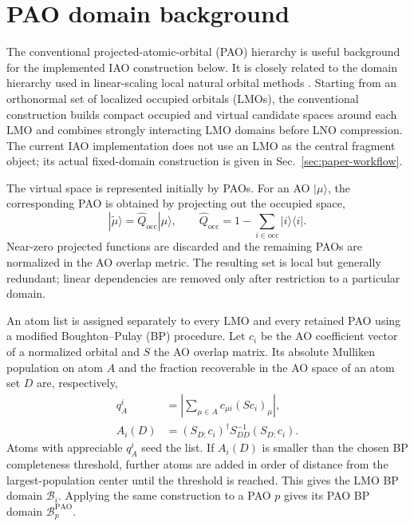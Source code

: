 \documentclass[11pt]{article}
\newcommand{\Bdom}{\mathcal{B}}
\begin{document}
\section{PAO domain background}
\label{sec:domain-construction}

The conventional projected-atomic-orbital (PAO) hierarchy is useful
background for the implemented IAO construction below.  It is closely related
to the domain hierarchy used in linear-scaling local natural orbital methods
\cite{pulay1983,boughton1993,nagy2016,nagy2018}.  Starting from an orthonormal
set of localized occupied orbitals (LMOs), the conventional construction
builds compact occupied and virtual candidate spaces around each LMO and
combines strongly interacting LMO domains before LNO compression.  The current
IAO implementation does not use an LMO as the central fragment object; its
actual fixed-domain construction is given in
Sec.~\ref{sec:paper-workflow}.

The virtual space is represented initially by PAOs.  For an AO $|\mu\rangle$,
the corresponding PAO is obtained by projecting out the occupied space,
\begin{equation}
  |\widetilde\mu\rangle
  = \hat Q_{\mathrm{occ}}|\mu\rangle,
  \qquad
  \hat Q_{\mathrm{occ}}
  = 1-\sum_{i\in\mathrm{occ}} |i\rangle\langle i| .
  \label{eq:pao-definition}
\end{equation}
Near-zero projected functions are discarded and the remaining PAOs are
normalized in the AO overlap metric.  The resulting set is local but generally
redundant; linear dependencies are removed only after restriction to a
particular domain.

An atom list is assigned separately to every LMO and every retained PAO using
a modified Boughton--Pulay (BP) procedure.  Let $c_i$ be the AO coefficient
vector of a normalized orbital and $S$ the AO overlap matrix.  Its absolute
Mulliken population on atom $A$ and the fraction recoverable in the AO space of
an atom set $D$ are, respectively,
\begin{align}
 q_A^{i} & = \left|\sum_{\mu\in A}c_{\mu i}(Sc_i)_\mu\right|, \\
 A_i(D)  & = (S_{D:}c_i)^\dagger S_{DD}^{-1}(S_{D:}c_i).
 \label{eq:bp-completeness}
\end{align}
Atoms with appreciable $q_A^i$ seed the list.  If $A_i(D)$ is smaller than the
chosen BP completeness threshold, further atoms are added in order of distance
from the largest-population center until the threshold is reached.  This gives
the LMO BP domain $\Bdom_i$.  Applying the same construction to a PAO $p$
gives its PAO BP domain $\Bdom_p^{\mathrm{PAO}}$.
\end{document}
